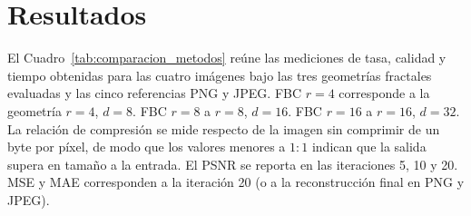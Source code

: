 
\section{Resultados}
\label{sec:resultados}

El Cuadro~\ref{tab:comparacion_metodos} reúne las mediciones de tasa, calidad y tiempo obtenidas para las cuatro imágenes bajo las tres geometrías fractales evaluadas y las cinco referencias PNG y JPEG. FBC $r{=}4$ corresponde a la geometría $r=4$, $d=8$. FBC $r{=}8$ a $r=8$, $d=16$. FBC $r{=}16$ a $r=16$, $d=32$. La relación de compresión se mide respecto de la imagen sin comprimir de un byte por píxel, de modo que los valores menores a $1{:}1$ indican que la salida supera en tamaño a la entrada. El PSNR se reporta en las iteraciones 5, 10 y 20. MSE y MAE corresponden a la iteración 20 (o a la reconstrucción final en PNG y JPEG).

